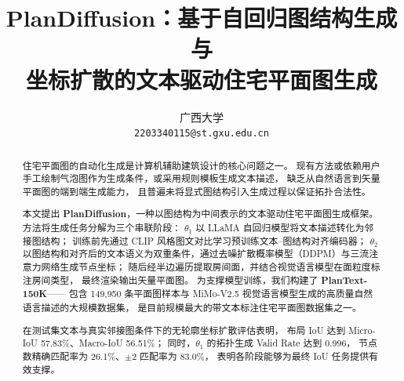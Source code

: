 \documentclass[10pt,a4paper]{article}
\title{
    \vspace{-1em}
    {\large \textbf{PlanDiffusion：基于自回归图结构生成与}}\\[2pt]
    {\large \textbf{坐标扩散的文本驱动住宅平面图生成}}
    \vspace{-0.5em}
}
\author{
    {\small 广西大学} \\
    {\small \texttt{2203340115@st.gxu.edu.cn}}
}
\date{}
\begin{document}
\maketitle
\thispagestyle{empty}

\begin{abstract}
住宅平面图的自动化生成是计算机辅助建筑设计的核心问题之一。
现有方法或依赖用户手工绘制气泡图作为生成条件，或采用规则模板生成文本描述，
缺乏从自然语言到矢量平面图的端到端生成能力，
且普遍未将显式图结构引入生成过程以保证拓扑合法性。

本文提出 \textbf{PlanDiffusion}，一种以图结构为中间表示的文本驱动住宅平面图生成框架。
方法将生成任务分解为三个串联阶段：
$\theta_1$ 以 LLaMA 自回归模型将文本描述转化为邻接图结构；
训练前先通过 CLIP 风格图文对比学习预训练文本--图结构对齐编码器；
$\theta_2$ 以图结构和对齐后的文本语义为双重条件，通过去噪扩散概率模型（DDPM）与三流注意力网络生成节点坐标；
随后经半边遍历提取房间面，并结合视觉语言模型在面粒度标注房间类型，
最终渲染输出矢量平面图。
为支撑模型训练，我们构建了 \textbf{PlanText-150K}——
包含 149,950 条平面图样本与 MiMo-V2.5 视觉语言模型生成的高质量自然语言描述的大规模数据集，
是目前规模最大的带文本标注住宅平面图数据集之一。

在测试集文本与真实邻接图条件下的无轮廓坐标扩散评估表明，
布局 IoU 达到 Micro-IoU 57.83\%、Macro-IoU 56.51\%；
同时，$\theta_1$ 的拓扑生成 Valid Rate 达到 0.996，
节点数精确匹配率为 26.1\%、$\pm2$ 匹配率为 83.0\%，
表明各阶段能够为最终 IoU 任务提供有效支撑。
\end{abstract}







{\small


}


\end{document}
